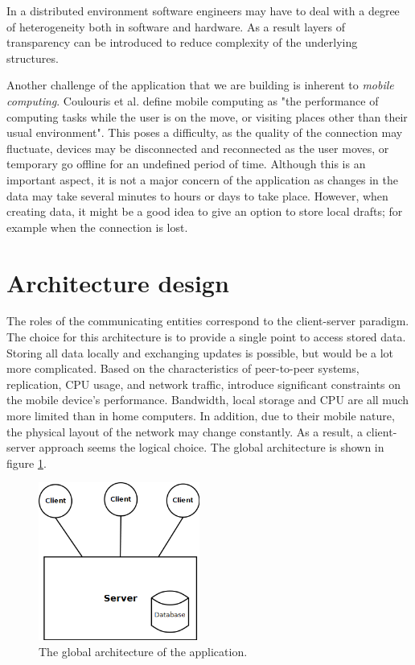 In a distributed environment software engineers may have to deal with a degree of heterogeneity both in software and hardware. As a result layers of transparency can be introduced to reduce complexity of the underlying structures.

Another challenge of the application that we are building is inherent to \emph{mobile computing}. Coulouris et al. define mobile computing as "the performance of computing tasks while the user is on the move, or visiting places other than their usual environment"\cite{coulouris:2012}. This poses a difficulty, as the quality of the connection may fluctuate, devices may be disconnected and reconnected as the user moves, or temporary go offline for an undefined period of time\cite{coulouris:2012}. Although this is an important aspect, it is not a major concern of the application as changes in the data may take several minutes to hours or days to take place. However, when creating data, it might be a good idea to give an option to store local drafts; for example when the connection is lost.


\section{Architecture design}

The roles of the communicating entities correspond to the client-server paradigm. The choice for this architecture is to provide a single point to access stored data. Storing all data locally and exchanging updates is possible, but would be a lot more complicated. Based on the characteristics of peer-to-peer systems, replication, CPU usage, and network traffic, introduce significant constraints on the mobile device's performance. Bandwidth, local storage and CPU are all much more limited than in home computers. In addition, due to their mobile nature, the physical layout of the network may change constantly. As a result, a client-server approach seems the logical choice. The global architecture is shown in figure \ref{figure:architecture:global}.

\begin{figure}
	
	\begin{center}
		\includegraphics[width=200px]{img/architecture_global}
		\caption{The global architecture of the application.}
		\label{figure:architecture:global}
	\end{center}

\end{figure}

